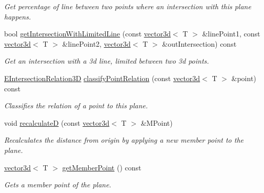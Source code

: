 \begin{DoxyCompactItemize}
\begin{DoxyCompactList}\small\item\em Get percentage of line between two points where an intersection with this plane happens. \end{DoxyCompactList}\item 
bool \hyperlink{classirr_1_1core_1_1plane3d_a6bec8dcaa0eeb9f7bdd5b727f3d3561d}{get\+Intersection\+With\+Limited\+Line} (const \hyperlink{classirr_1_1core_1_1vector3d}{vector3d}$<$ T $>$ \&line\+Point1, const \hyperlink{classirr_1_1core_1_1vector3d}{vector3d}$<$ T $>$ \&line\+Point2, \hyperlink{classirr_1_1core_1_1vector3d}{vector3d}$<$ T $>$ \&out\+Intersection) const
\begin{DoxyCompactList}\small\item\em Get an intersection with a 3d line, limited between two 3d points. \end{DoxyCompactList}\item 
\hyperlink{namespaceirr_1_1core_a8a9999eb0d151083f48afe5f7d17a96c}{E\+Intersection\+Relation3D} \hyperlink{classirr_1_1core_1_1plane3d_a14ba310b0ed9d14ce575f1c783cbd9a5}{classify\+Point\+Relation} (const \hyperlink{classirr_1_1core_1_1vector3d}{vector3d}$<$ T $>$ \&point) const
\begin{DoxyCompactList}\small\item\em Classifies the relation of a point to this plane. \end{DoxyCompactList}\item 
\mbox{\label{classirr_1_1core_1_1plane3d_a65c1748d516ddc820b6b970f9367f1ff}} 
void \hyperlink{classirr_1_1core_1_1plane3d_a65c1748d516ddc820b6b970f9367f1ff}{recalculateD} (const \hyperlink{classirr_1_1core_1_1vector3d}{vector3d}$<$ T $>$ \&M\+Point)
\begin{DoxyCompactList}\small\item\em Recalculates the distance from origin by applying a new member point to the plane. \end{DoxyCompactList}\item 
\mbox{\label{classirr_1_1core_1_1plane3d_a6862a53e67b3a8d616986216167d0c7a}} 
\hyperlink{classirr_1_1core_1_1vector3d}{vector3d}$<$ T $>$ \hyperlink{classirr_1_1core_1_1plane3d_a6862a53e67b3a8d616986216167d0c7a}{get\+Member\+Point} () const
\begin{DoxyCompactList}\small\item\em Gets a member point of the plane. \end{DoxyCompactList}\item 

\end{DoxyCompactItemize}
